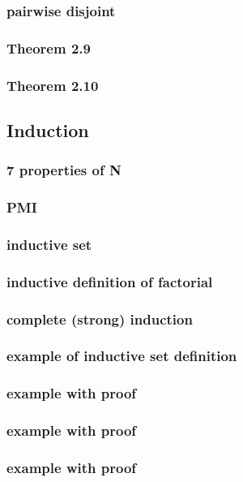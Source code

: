 \documentclass[a4paper]{article}
\begin{document}
\subsubsection*{pairwise disjoint}
\subsubsection*{Theorem 2.9}
\subsubsection*{Theorem 2.10}

\newpage
\subsection{Induction}   %
\subsubsection*{7 properties of N}
\subsubsection*{PMI}
\subsubsection*{inductive set}
\subsubsection*{inductive definition of factorial}
\subsubsection*{complete (strong) induction}
\subsubsection*{example of inductive set definition}
\subsubsection*{example with proof}
\subsubsection*{example with proof}
\subsubsection*{example with proof}
\end{document}
